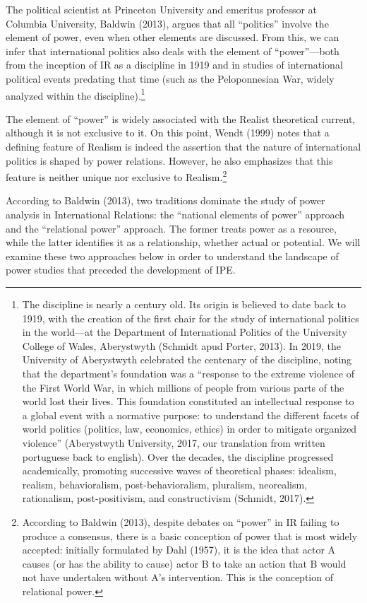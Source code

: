 The political scientist at Princeton University and emeritus professor at Columbia University, Baldwin (2013), argues that all ``politics'' involve the element of power, even when other elements are discussed. From this, we can infer that international politics also deals with the element of ``power''---both from the inception of IR as a discipline in 1919 and in studies of international political events predating that time (such as the Peloponnesian War, widely analyzed within the discipline).\footnote{The discipline is nearly a century old. Its origin is believed to date back to 1919, with the creation of the first chair for the study of international politics in the world---at the Department of International Politics of the University College of Wales, Aberystwyth (Schmidt apud Porter, 2013). In 2019, the University of Aberystwyth celebrated the centenary of the discipline, noting that the department's foundation was a ``response to the extreme violence of the First World War, in which millions of people from various parts of the world lost their lives. This foundation constituted an intellectual response to a global event with a normative purpose: to understand the different facets of world politics (politics, law, economics, ethics) in order to mitigate organized violence'' (Aberystwyth University, 2017, our translation from written portuguese back to english). Over the decades, the discipline progressed academically, promoting successive waves of theoretical phases: idealism, realism, behavioralism, post-behavioralism, pluralism, neorealism, rationalism, post-positivism, and constructivism (Schmidt, 2017).}

The element of ``power'' is widely associated with the Realist theoretical current, although it is not exclusive to it. On this point, Wendt (1999) notes that a defining feature of Realism is indeed the assertion that the nature of international politics is shaped by power relations. However, he also emphasizes that this feature is neither unique nor exclusive to Realism.\footnote{According to Baldwin (2013), despite debates on ``power'' in IR failing to produce a consensus, there is a basic conception of power that is most widely accepted: initially formulated by Dahl (1957), it is the idea that actor A causes (or has the ability to cause) actor B to take an action that B would not have undertaken without A's intervention. This is the conception of relational power.}

According to Baldwin (2013), two traditions dominate the study of power analysis in International Relations: the ``national elements of power'' approach and the ``relational power'' approach. The former treats power as a resource, while the latter identifies it as a relationship, whether actual or potential. We will examine these two approaches below in order to understand the landscape of power studies that preceded the development of IPE.

